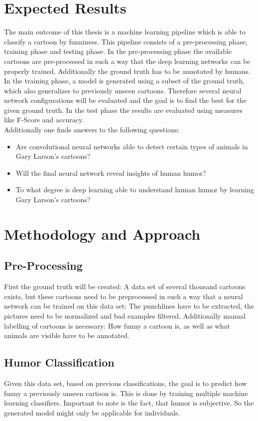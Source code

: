 \documentclass[11pt]{article}
\begin{document}
\section{Expected Results}
The main outcome of this thesis is a machine learning pipeline which is able to classify a cartoon by funniness. This pipeline consists of a pre-processing phase, training phase and testing phase. In the pre-processing phase the available cartoons are pre-processed in such a way that the deep learning networks can be properly trained. Additionally the ground truth has to be annotated by humans. In the training phase, a model is generated using a subset of the ground truth, which also generalizes to previously unseen cartoons. Therefore several neural network configurations will be evaluated and the goal is to find the best for the given ground truth. In the test phase the results are evaluated using measures like F-Score and accuracy. \\

Additionally one finds answers to the following questions: 
\begin{itemize}
\item Are convolutional neural networks able to detect certain types of animals in Gary Larson's cartoons?
\item Will the final neural network reveal insights of human humor?
\item To what degree is deep learning able to understand human humor by learning Gary Larson's cartoons?
\end{itemize}

\pagebreak
\section{Methodology and Approach}
\subsection {Pre-Processing}
First the ground truth will be created: A data set of several thousand cartoons exists, but these cartoons need to be preprocessed in such a way that a neural network can be trained on this data set: The punchlines have to be extracted, the pictures need to be normalized and bad examples filtered. Additionally manual labelling of cartoons is necessary: How funny a cartoon is, as well as what animals are visible have to be annotated. \\

\subsection {Humor Classification}
Given this data set, based on previous classifications, the goal is to predict how funny a previously unseen cartoon is. This is done by training multiple machine learning classifiers. Important to note is the fact, that humor is subjective. So the generated model might only be applicable for individuals. \\
\end{document}
